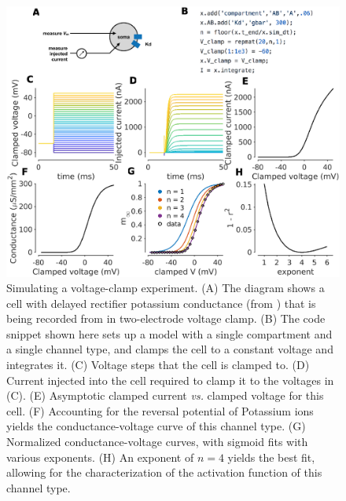 \documentclass{frontiersSCNS} %
\newcommand{\vs}{\textit{vs.}\xspace}
\begin{document}
\begin{figure}[!htb]
	\centering
	\includegraphics[width=1.0\linewidth]{gfx/figure_clamp}
	\caption{Simulating a voltage-clamp experiment. (A) The diagram shows a cell with delayed rectifier potassium conductance (from \cite{liuModelNeuronActivityDependent1998}) that is being recorded from in two-electrode voltage clamp. (B) The code snippet shown here sets up a model with a single compartment and a single channel type, and clamps the cell to a constant voltage and integrates it. (C) Voltage steps that the cell is clamped to. (D) Current injected into the cell required to clamp it to the voltages in (C). (E) Asymptotic clamped current \vs clamped voltage for this cell. (F) Accounting for the reversal potential of Potassium ions yields the conductance-voltage curve of this channel type. (G) Normalized conductance-voltage curves, with sigmoid fits with various exponents. (H) An exponent of $n=4$ yields the best fit, allowing for the characterization of the activation function of this channel type. }
	\label{fig:figureclamp}
\end{figure}
\end{document}
